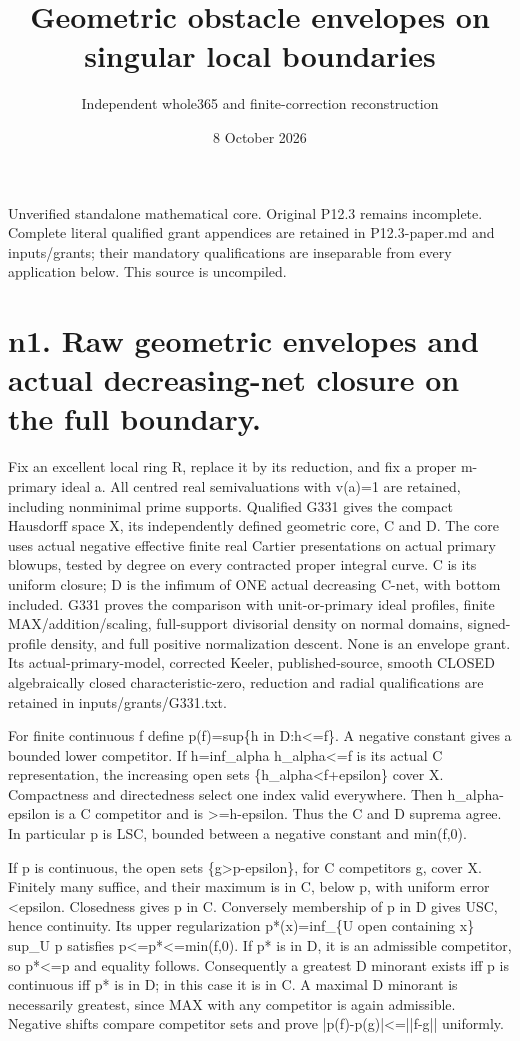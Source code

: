 \documentclass[11pt]{article}
\title{Geometric obstacle envelopes on singular local boundaries}
\author{Independent whole365 and finite-correction reconstruction}
\date{8 October 2026}
\begin{document}
\maketitle
Unverified standalone mathematical core. Original P12.3 remains incomplete.
Complete literal qualified grant appendices are retained in P12.3-paper.md
and inputs/grants; their mandatory qualifications are inseparable from every
application below. This source is uncompiled.

\section*{n1. Raw geometric envelopes and actual decreasing-net closure on the full boundary.}
Fix an excellent local ring R, replace it by its reduction, and fix a proper m-primary ideal a. All centred real semivaluations with v(a)=1 are retained, including nonminimal prime supports. Qualified G331 gives the compact Hausdorff space X, its independently defined geometric core, C and D. The core uses actual negative effective finite real Cartier presentations on actual primary blowups, tested by degree on every contracted proper integral curve. C is its uniform closure; D is the infimum of ONE actual decreasing C-net, with bottom included. G331 proves the comparison with unit-or-primary ideal profiles, finite MAX/addition/scaling, full-support divisorial density on normal domains, signed-profile density, and full positive normalization descent. None is an envelope grant. Its actual-primary-model, corrected Keeler, published-source, smooth CLOSED algebraically closed characteristic-zero, reduction and radial qualifications are retained in inputs/grants/G331.txt.

For finite continuous f define p(f)=sup\{h in D:h<=f\}. A negative constant gives a bounded lower competitor. If h=inf\_alpha h\_alpha<=f is its actual C representation, the increasing open sets \{h\_alpha<f+epsilon\} cover X. Compactness and directedness select one index valid everywhere. Then h\_alpha-epsilon is a C competitor and is >=h-epsilon. Thus the C and D suprema agree. In particular p is LSC, bounded between a negative constant and min(f,0).

If p is continuous, the open sets \{g>p-epsilon\}, for C competitors g, cover X. Finitely many suffice, and their maximum is in C, below p, with uniform error <epsilon. Closedness gives p in C. Conversely membership of p in D gives USC, hence continuity. Its upper regularization p*(x)=inf\_\{U open containing x\} sup\_U p satisfies p<=p*<=min(f,0). If p* is in D, it is an admissible competitor, so p*<=p and equality follows. Consequently a greatest D minorant exists iff p is continuous iff p* is in D; in this case it is in C. A maximal D minorant is necessarily greatest, since MAX with any competitor is again admissible. Negative shifts compare competitor sets and prove |p(f)-p(g)|<=||f-g|| uniformly.
\end{document}

